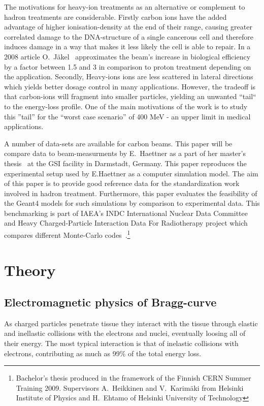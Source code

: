 The motivations for heavy-ion treatments as an alternative or complement to hadron treatments are considerable. Firstly carbon ions have the added advantage of higher ionisation-density at the end of their range, causing greater correlated damage to the DNA-structure of a single cancerous cell and therefore induces damage in a way that makes it less likely the cell is able to repair. In a 2008 article O.~Jäkel~\cite{ojakel} approximates the beam's increase in biological efficiency by a factor between 1.5 and 3 in comparison to proton treatment depending on the application. Secondly, Heavy-ions ions are less scattered in lateral directions which yields better dosage control in many applications. However, the tradeoff is that carbon-ions will fragment into smaller particles, yielding an unwanted ``tail`` to the energy-loss profile. One of the main motivations of the work is to study this ''tail'' for the ``worst case scenario'' of 400 MeV - an upper limit in medical applications.

A number of data-sets are available for carbon beams. This paper will be compare data to beam-measurments by E.~Haettner as a part of her master's thesis~\cite{ehaettner}  at the GSI facility in Darmstadt, Germany. This paper reproduces the experimental setup used by E.Haettner as a computer simulation model. The aim of this paper is to provide good reference data for the standardization work involved in hadron treatment. Furthermore, this paper evaluates the feasibility of the Geant4 models for such simulations by comparison to experimental data. This benchmarking is part of IAEA's INDC International Nuclear Data Committee and Heavy Charged-Particle Interaction Data For Radiotherapy project which compares different Monte-Carlo codes~\cite{SummaryReport}.\footnote{Bachelor's thesis produced in the framework of the Finnish CERN Summer Training 2009. Supervisors A.~Heikkinen and V.~Karimäki from Helsinki Institute of Physics and H.~Ehtamo of Helsinki University of Technology} %

\clearpage
\section{Theory}

\subsection{Electromagnetic physics of Bragg-curve}
As charged particles penetrate tissue they interact with the tissue through elastic and inellastic collisions with the electrons and nuclei, eventually loosing all of their energy. The most typical interaction is that of inelastic collisions with electrons, contributing as much as 99\% of the total energy loss.


